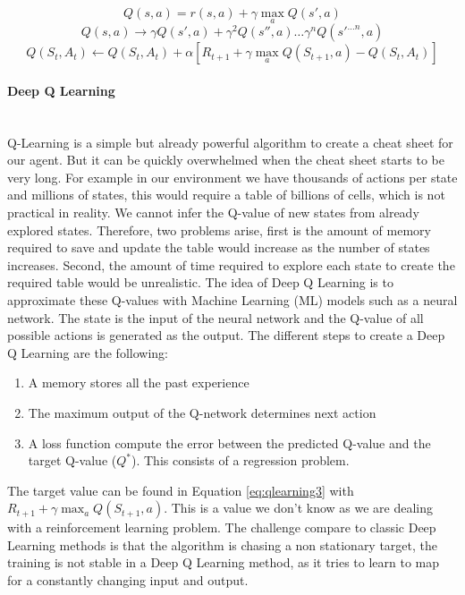         \begin{equation}
            Q(s,a) = r(s,a) + \gamma \max_{a}Q(s',a)
            \label{eq:qlearning1}
        \end{equation}
        \begin{equation}
            Q(s,a) \rightarrow \gamma Q(s',a) + \gamma^2 Q(s'',a) \dots \gamma^{n} Q(s'^{\dots n}, a)
            \label{eq:qlearning2}
        \end{equation}
        \begin{equation}
            Q(S_t, A_t) \leftarrow Q(S_t, A_t) + \alpha \left[ R_{t+1} + \gamma \max_{a} Q(S_{t+1}, a) - Q(S_t,A_t) \right]
            \label{eq:qlearning3}
        \end{equation}
        
        \paragraph{Deep Q Learning}~\\
        Q-Learning is a simple but already powerful algorithm to create a cheat sheet for our agent. But it can be quickly overwhelmed when the cheat sheet starts to be very long. For example in our environment we have thousands of actions per state and millions of states, this would require a table of billions of cells, which is not practical in reality. We cannot infer the Q-value of new states from already explored states. Therefore, two problems arise, first is the amount of memory required to save and update the table would increase as the number of states increases. Second, the amount of time required to explore each state to create the required table would be unrealistic. The idea of Deep Q Learning is to approximate these Q-values with Machine Learning (ML) models such as a neural network. The state is the input of the neural network and the Q-value of all possible actions is generated as the output. The different steps to create a Deep Q Learning are the following:
        \begin{enumerate}
            \item A memory stores all the past experience
            \item The maximum output of the Q-network determines next action
            \item A loss function compute the error between the predicted Q-value and the target Q-value ($Q^*$). This consists of a regression problem.
        \end{enumerate}
        The target value can be found in Equation \ref{eq:qlearning3} with $R_{t+1} + \gamma \max_a Q(S_{t+1}, a)$. This is a value we don't know as we are dealing with a reinforcement learning problem. The challenge compare to classic Deep Learning methods is that the algorithm is chasing a non stationary target, the training is not stable in a Deep Q Learning method, as it tries to learn to map for a constantly changing input and output.
        
